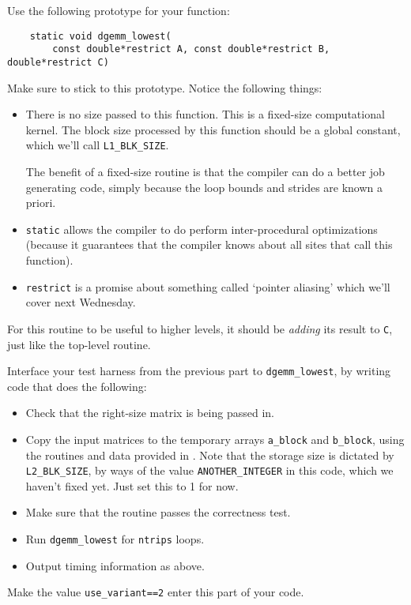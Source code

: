 \documentclass[11pt]{article}
\begin{document}
\begin{enumerate}[a)]
    Use the following prototype for your function:
    \begin{lstlisting}
    static void dgemm_lowest(
        const double*restrict A, const double*restrict B, double*restrict C)
    \end{lstlisting}

    Make sure to stick to this prototype. Notice the following things:
    \begin{itemize}
      \item There is no size passed to this function. This is a
        fixed-size computational kernel. The block size processed
        by this function should be a global constant, which we'll
        call \texttt{L1\_BLK\_SIZE}.

        The benefit of a fixed-size routine is that the compiler can
        do a better job generating code, simply because the loop
        bounds and strides are known a priori.
      \item \texttt{static} allows the compiler to do perform
        inter-procedural optimizations (because it guarantees that the
        compiler knows about all sites that call this function).
      \item 
        \texttt{restrict} is a promise about something called
        `pointer aliasing' which we'll cover next Wednesday.
    \end{itemize}
    For this routine to be useful to higher levels, it should be
    \emph{adding} its result to \texttt{C}, just like the top-level
    routine.

    Interface your test harness from the previous part to
    \texttt{dgemm\_lowest}, by writing code that does the
    following:
    \begin{itemize}
      \item Check that the right-size matrix is being passed in.
      \item Copy the input matrices to the temporary arrays
        \texttt{a\_block} and \texttt{b\_block}, using the routines
        and data provided in
        .
        Note that the storage size is dictated by
        \texttt{L2\_BLK\_SIZE}, by ways of the value
        \texttt{ANOTHER\_INTEGER} in this code, which we haven't fixed
        yet. Just set this to 1 for now.

      \item Make sure that the routine passes the correctness test.
      \item Run \texttt{dgemm\_lowest} for \texttt{ntrips} loops.
      \item Output timing information as above.
    \end{itemize}
    Make the value \texttt{use\_variant==2} enter this part of your
    code.


\end{enumerate}
\end{document}
